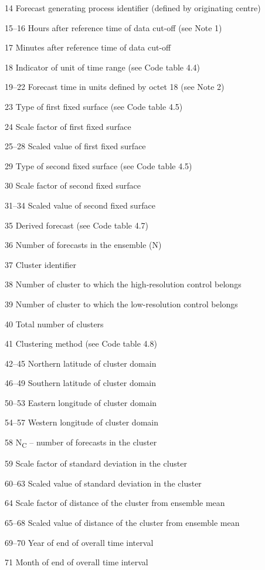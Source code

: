 14 Forecast generating process identifier (defined by originating centre)

15--16 Hours after reference time of data cut-off (see Note 1)

17 Minutes after reference time of data cut-off

18 Indicator of unit of time range (see Code table 4.4)

19--22 Forecast time in units defined by octet 18 (see Note 2)

23 Type of first fixed surface (see Code table 4.5)

24 Scale factor of first fixed surface

25--28 Scaled value of first fixed surface

29 Type of second fixed surface (see Code table 4.5)

30 Scale factor of second fixed surface

31--34 Scaled value of second fixed surface

35 Derived forecast (see Code table 4.7)

36 Number of forecasts in the ensemble (N)

37 Cluster identifier

38 Number of cluster to which the high-resolution control belongs

39 Number of cluster to which the low-resolution control belongs

40 Total number of clusters

41 Clustering method (see Code table 4.8)

42--45 Northern latitude of cluster domain

46--49 Southern latitude of cluster domain

50--53 Eastern longitude of cluster domain

54--57 Western longitude of cluster domain

58 N\textsubscript{C} -- number of forecasts in the cluster

59 Scale factor of standard deviation in the cluster

60--63 Scaled value of standard deviation in the cluster

64 Scale factor of distance of the cluster from ensemble mean

65--68 Scaled value of distance of the cluster from ensemble mean

69--70 Year of end of overall time interval

71 Month of end of overall time interval

